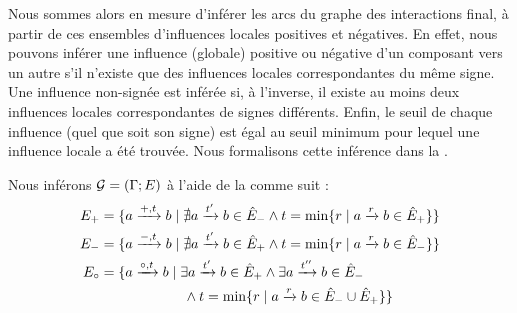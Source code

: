 Nous sommes alors en mesure d'inférer les arcs du graphe des interactions final,
à partir de ces ensembles d'influences locales positives et négatives.
En effet, nous pouvons inférer une influence (globale) positive ou négative
d'un composant vers un autre
s'il n'existe que des influences locales correspondantes du même signe.
Une influence non-signée est inférée si, à l'inverse, il existe au moins deux influences
locales correspondantes de signes différents.
Enfin, le seuil de chaque influence (quel que soit son signe)
est égal au seuil minimum pour lequel une influence locale a été trouvée.
Nous formalisons cette inférence dans la .

\begin{proposition}
  Nous inférons $\mathcal{G} = (\Gamma; E)$ à l'aide de la  comme suit :
  \begin{align*}
    E_+ &= \{ a \xrightarrow{+, t} b \mid \nexists a \xrightarrow{t'} b \in \hat{E}_-
      \wedge t = \min \{ r \mid a \xrightarrow{r} b \in \hat{E}_+ \}\} \\
    E_- &= \{ a \xrightarrow{-, t} b \mid \nexists a \xrightarrow{t'} b \in \hat{E}_+
      \wedge t = \min \{ r \mid a \xrightarrow{r} b \in \hat{E}_- \}\} \\
    E_\circ &= \{ a \xrightarrow{\circ, t} b \mid \exists a \xrightarrow{t'} b \in \hat{E}_+ \wedge
      \exists a \xrightarrow{t''} b \in \hat{E}_- \\
      & \qquad\qquad\qquad \wedge t = \min \{ r \mid
      a \xrightarrow{r} b \in \hat{E}_- \cup \hat{E}_+ \} \}
  \end{align*}
\end{proposition}




